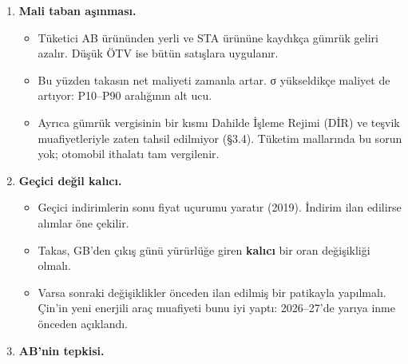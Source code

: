 \begin{enumerate}
  \begin{itemize}
  \tightlist
  \item
    İndirim bütün dilimlerde aynı oranda yapılmalı.
  \item
    2022'de elektrikli otomobil dilimlerinin 160 kW'a göre yeniden kesildiği belgelendi. Togg T10X'in arkadan itişli sürümü 160 kW. TBMM'de ``yerli üretimi korumak'' amacı açıkça söylendi (AK Parti Grup Başkanvekili, Temmuz 2022).
  \item
    Şili--Alkol ve Meksika--Meşrubat içtihadına göre bu bir risk işaretidir.
  \item
    Hafifletici unsur: Tesla, BMW ve VW yazılımla 160 kW'a sınırlanmış sürümler çıkardı. 2025'te 160 kW altı elektrikli otomobiller pazarın \%13,9'uydu.
  \item
    Takas yeni bir eşik yaratmamalı, mevcut eşikleri genişletmemeli.
  \end{itemize}
\item
  \textbf{Mali taban aşınması.}

  \begin{itemize}
  \tightlist
  \item
    Tüketici AB ürününden yerli ve STA ürününe kaydıkça gümrük geliri azalır. Düşük ÖTV ise bütün satışlara uygulanır.
  \item
    Bu yüzden takasın net maliyeti zamanla artar. σ yükseldikçe maliyet de artıyor: P10--P90 aralığının alt ucu.
  \item
    Ayrıca gümrük vergisinin bir kısmı Dahilde İşleme Rejimi (DİR) ve teşvik muafiyetleriyle zaten tahsil edilmiyor (§3.4). Tüketim mallarında bu sorun yok; otomobil ithalatı tam vergilenir.
  \end{itemize}
\item
  \textbf{Geçici değil kalıcı.}

  \begin{itemize}
  \tightlist
  \item
    Geçici indirimlerin sonu fiyat uçurumu yaratır (2019). İndirim ilan edilirse alımlar öne çekilir.
  \item
    Takas, GB'den çıkış günü yürürlüğe giren \textbf{kalıcı} bir oran değişikliği olmalı.
  \item
    Varsa sonraki değişiklikler önceden ilan edilmiş bir patikayla yapılmalı. Çin'in yeni enerjili araç muafiyeti bunu iyi yaptı: 2026--27'de yarıya inme önceden açıklandı.
  \end{itemize}
\item
  \textbf{AB'nin tepkisi.}


\end{enumerate}
